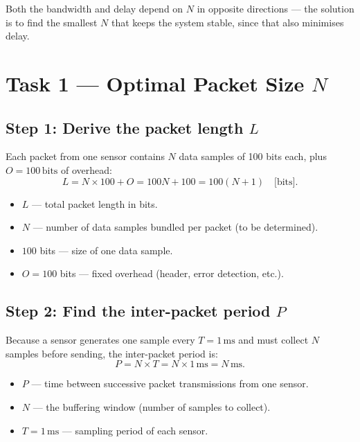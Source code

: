 \documentclass[12pt, a4paper]{article}
\begin{document}
Both the bandwidth and delay depend on $N$ in opposite directions --- the
solution is to find the smallest $N$ that keeps the system stable, since that
also minimises delay.

\section*{Task 1 --- Optimal Packet Size $N$}

\subsection*{Step 1: Derive the packet length $L$}

Each packet from one sensor contains $N$ data samples of 100 bits each, plus
$O = 100\,\mathrm{bits}$ of overhead:
\[
  L = N \times 100 + O = 100N + 100 = 100(N+1) \quad \text{[bits]}.
\]
\begin{itemize}[leftmargin=1.4em, itemsep=2pt]
  \item $L$ --- total packet length in bits.
  \item $N$ --- number of data samples bundled per packet (to be determined).
  \item $100$ bits --- size of one data sample.
  \item $O = 100$ bits --- fixed overhead (header, error detection, etc.).
\end{itemize}

\subsection*{Step 2: Find the inter-packet period $P$}

Because a sensor generates one sample every $T = 1\,\mathrm{ms}$ and must
collect $N$ samples before sending, the inter-packet period is:
\[
  P = N \times T = N \times 1\,\mathrm{ms} = N\,\mathrm{ms}.
\]
\begin{itemize}[leftmargin=1.4em, itemsep=2pt]
  \item $P$ --- time between successive packet transmissions from one sensor.
  \item $N$ --- the buffering window (number of samples to collect).
  \item $T = 1\,\mathrm{ms}$ --- sampling period of each sensor.
\end{itemize}
\end{document}
